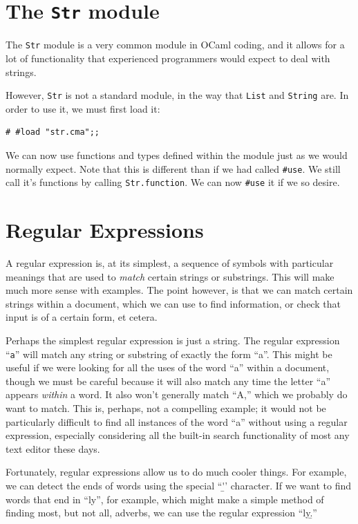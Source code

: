 \documentclass[10pt]{book}
\begin{document}
\section{The {\tt Str} module}

The {\tt Str} module is a very common module in OCaml coding, and it allows for a lot of functionality that experienced programmers would expect to deal with strings.

However, {\tt Str} is not a standard module, in the way that {\tt List} and {\tt String} are. In order to use it, we must first load it:
\beforeverb
\begin{verbatim}
# #load "str.cma";;
\end{verbatim}
\afterverb

We can now use functions and types defined within the module just as we would normally expect. Note that this is different than if we had called {\tt \#use}. We still call it's functions by calling {\tt Str.function}. We can now {\tt \#use} it if we so desire.

\section{Regular Expressions}

A regular expression is, at its simplest, a sequence of symbols with particular meanings that are used to {\em match} certain strings or substrings. This will make much more sense with examples. The point however, is that we can match certain strings within a document, which we can use to find information, or check that input is of a certain form, et cetera.

Perhaps the simplest regular expression is just a string. The regular expression ``{\tt a}'' will match any string or substring of exactly the form ``a''. This might be useful if we were looking for all the uses of the word ``a'' within a document, though we must be careful because it will also match any time the letter ``a'' appears {\it within} a word. It also won't generally match ``A,'' which we probably do want to match. This is, perhaps, not a compelling example; it would not be particularly difficult to find all instances of the word ``a'' without using a regular expression, especially considering all the built-in search functionality of most any text editor these days.

Fortunately, regular expressions allow us to do much cooler things. For example, we can detect the ends of words using the special ``\b'' character. If we want to find words that end in ``ly'', for example, which might make a simple method of finding most, but not all, adverbs, we can use the regular expression ``ly\b.''
\end{document}
